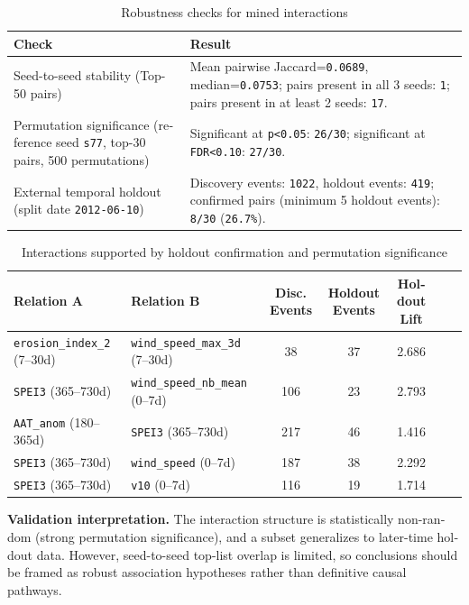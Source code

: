 \documentclass[12pt,a4paper]{article}
\begin{document}
\begin{latin}
\begin{table}[H]
\centering
\caption{Robustness checks for mined interactions}
\label{tab:interaction_validation_summary}
\begin{tabular}{P{5.1cm}P{8.8cm}}
\toprule
Check & Result \\
\midrule
Seed-to-seed stability (Top-50 pairs) & Mean pairwise Jaccard=\texttt{0.0689}, median=\texttt{0.0753}; pairs present in all 3 seeds: \texttt{1}; pairs present in at least 2 seeds: \texttt{17}. \\
Permutation significance (reference seed \texttt{s77}, top-30 pairs, 500 permutations) & Significant at \texttt{p<0.05}: \texttt{26/30}; significant at \texttt{FDR<0.10}: \texttt{27/30}. \\
External temporal holdout (split date \texttt{2012-06-10}) & Discovery events: \texttt{1022}, holdout events: \texttt{419}; confirmed pairs (minimum 5 holdout events): \texttt{8/30} (\texttt{26.7\%}). \\
\bottomrule
\end{tabular}
\end{table}

\begin{table}[H]
\centering
\caption{Interactions supported by holdout confirmation and permutation significance}
\label{tab:interaction_multicheck}
\small
\begin{tabular}{P{4.3cm}P{4.1cm}ccccc}
\toprule
Relation A & Relation B & Disc. Events & Holdout Events & Holdout Lift \\
\midrule
\texttt{erosion\_index\_2} (7--30d) & \texttt{wind\_speed\_max\_3d} (7--30d) & 38 & 37 & 2.686 \\
\texttt{SPEI3} (365--730d) & \texttt{wind\_speed\_nb\_mean} (0--7d) & 106 & 23 & 2.793 \\
\texttt{AAT\_anom} (180--365d) & \texttt{SPEI3} (365--730d) & 217 & 46 & 1.416 \\
\texttt{SPEI3} (365--730d) & \texttt{wind\_speed} (0--7d) & 187 & 38 & 2.292 \\
\texttt{SPEI3} (365--730d) & \texttt{v10} (0--7d) & 116 & 19 & 1.714 \\
\bottomrule
\end{tabular}
\end{table}

\noindent\textbf{Validation interpretation.}
The interaction structure is statistically non-random (strong permutation significance), and a subset generalizes to later-time holdout data.
However, seed-to-seed top-list overlap is limited, so conclusions should be framed as robust association hypotheses rather than definitive causal pathways.


\end{latin}
\end{document}
